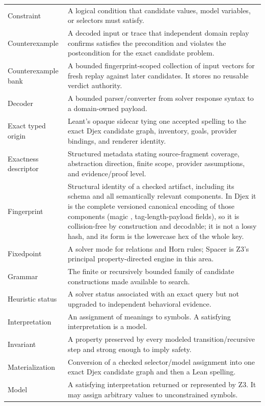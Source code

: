 \documentclass[10pt,letterpaper,oneside]{report}
\newcommand{\code}[1]{\texttt{\detokenize{#1}}}
\begin{document}
\begin{longtable}{@{}L{0.23\textwidth}L{0.71\textwidth}@{}}
Constraint & A logical condition that candidate values, model variables, or selectors must satisfy. \\
Counterexample & A decoded input or trace that independent domain replay confirms satisfies the precondition and violates the postcondition for the exact candidate problem. \\
Counterexample bank & A bounded fingerprint-scoped collection of input vectors for fresh replay against later candidates. It stores no reusable verdict authority. \\
Decoder & A bounded parser/converter from solver response syntax to a domain-owned payload. \\
Exact typed origin & Leant's opaque sidecar tying one accepted spelling to the exact Djex candidate graph, inventory, goals, provider bindings, and renderer identity. \\
Exactness descriptor & Structured metadata stating source-fragment coverage, abstraction direction, finite scope, provider assumptions, and evidence/proof level. \\
Fingerprint & Structural identity of a checked artifact, including its schema and all semantically relevant components. In Djex it is the complete versioned canonical encoding of those components (magic \code{DJEXFP}, tag-length-payload fields), so it is collision-free by construction and decodable; it is not a lossy hash, and its \code{Show} form is the lowercase hex of the whole key. \\
Fixedpoint & A solver mode for relations and Horn rules; Spacer is Z3's principal property-directed engine in this area. \\
Grammar & The finite or recursively bounded family of candidate constructions made available to search. \\
Heuristic status & A solver status associated with an exact query but not upgraded to independent behavioral evidence. \\
Interpretation & An assignment of meanings to symbols. A satisfying interpretation is a model. \\
Invariant & A property preserved by every modeled transition/recursive step and strong enough to imply safety. \\
Materialization & Conversion of a checked selector/model assignment into one exact Djex candidate graph and then a Lean spelling. \\
Model & A satisfying interpretation returned or represented by Z3. It may assign arbitrary values to unconstrained symbols. \\

\end{longtable}
\end{document}
